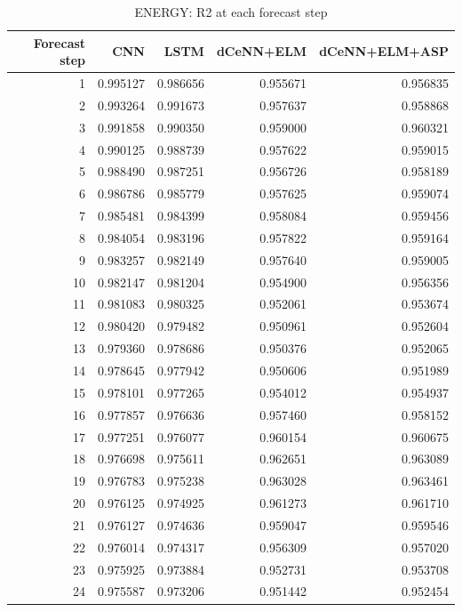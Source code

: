 \begin{table}
\caption{ENERGY: R2 at each forecast step}
\begin{tabular}{rrrrr}
\toprule
Forecast step & CNN & LSTM & dCeNN+ELM & dCeNN+ELM+ASP \\
\midrule
1 & 0.995127 & 0.986656 & 0.955671 & 0.956835 \\
2 & 0.993264 & 0.991673 & 0.957637 & 0.958868 \\
3 & 0.991858 & 0.990350 & 0.959000 & 0.960321 \\
4 & 0.990125 & 0.988739 & 0.957622 & 0.959015 \\
5 & 0.988490 & 0.987251 & 0.956726 & 0.958189 \\
6 & 0.986786 & 0.985779 & 0.957625 & 0.959074 \\
7 & 0.985481 & 0.984399 & 0.958084 & 0.959456 \\
8 & 0.984054 & 0.983196 & 0.957822 & 0.959164 \\
9 & 0.983257 & 0.982149 & 0.957640 & 0.959005 \\
10 & 0.982147 & 0.981204 & 0.954900 & 0.956356 \\
11 & 0.981083 & 0.980325 & 0.952061 & 0.953674 \\
12 & 0.980420 & 0.979482 & 0.950961 & 0.952604 \\
13 & 0.979360 & 0.978686 & 0.950376 & 0.952065 \\
14 & 0.978645 & 0.977942 & 0.950606 & 0.951989 \\
15 & 0.978101 & 0.977265 & 0.954012 & 0.954937 \\
16 & 0.977857 & 0.976636 & 0.957460 & 0.958152 \\
17 & 0.977251 & 0.976077 & 0.960154 & 0.960675 \\
18 & 0.976698 & 0.975611 & 0.962651 & 0.963089 \\
19 & 0.976783 & 0.975238 & 0.963028 & 0.963461 \\
20 & 0.976125 & 0.974925 & 0.961273 & 0.961710 \\
21 & 0.976127 & 0.974636 & 0.959047 & 0.959546 \\
22 & 0.976014 & 0.974317 & 0.956309 & 0.957020 \\
23 & 0.975925 & 0.973884 & 0.952731 & 0.953708 \\
24 & 0.975587 & 0.973206 & 0.951442 & 0.952454 \\
\bottomrule
\end{tabular}
\end{table}
